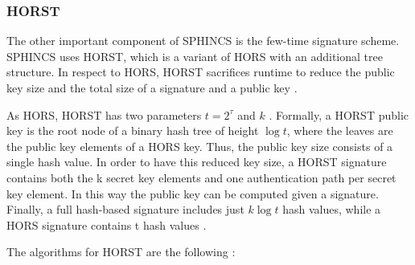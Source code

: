 \documentclass[a4paper,12pt]{article}
\begin{document}
\subsubsection{HORST}

The other important component of SPHINCS is the few-time signature scheme. SPHINCS uses HORST, which is a variant of HORS with an additional tree structure.
In respect to HORS, HORST sacrifices runtime to reduce the public key size and the total size of a signature and a public key \cite{1_sphincspaper}.

As HORS, HORST has two parameters $t = 2^{\tau}$ and $k$ \cite{4_wings}.
Formally, a HORST public key is the root node of a binary hash tree of height $\log t$, where the leaves are the public key elements of a HORS key. Thus, the public key size consists of a single hash value. In order to have this reduced key size, a HORST signature contains both the k secret key elements and one authentication path per secret key element. In this way the public key can be computed given a signature. Finally, a full hash-based signature includes just $k\log t$ hash values, while a HORS signature contains t hash values \cite{1_sphincspaper}.

The algorithms for HORST are the following \cite{1_sphincspaper}:
\end{document}
